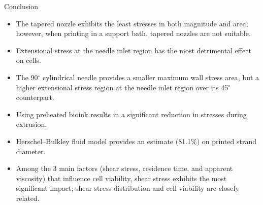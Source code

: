 \begin{frame}{Conclusion}
\begin{block}{}
\begin{itemize}
\item The tapered nozzle exhibits the least stresses in both magnitude and area; however, when printing in a support bath, tapered nozzles are not suitable.
\item Extensional stress at the needle inlet region has the most detrimental effect on cells.
\item The 90$^{\circ}$ cylindrical needle provides a smaller maximum wall stress area, but a higher extensional stress region at the needle inlet region over its 45$^{\circ}$ counterpart.
\item Using preheated bioink results in a significant reduction in stresses during extrusion.
\item Herschel–Bulkley fluid model provides an estimate (81.1$\%$) on printed strand diameter.
\item Among the 3 main factors (shear stress, residence time, and apparent viscosity) that influence cell viability, shear stress exhibits the most significant impact; shear stress distribution and cell viability are closely related.
\end{itemize}
\end{block}

\end{frame}

